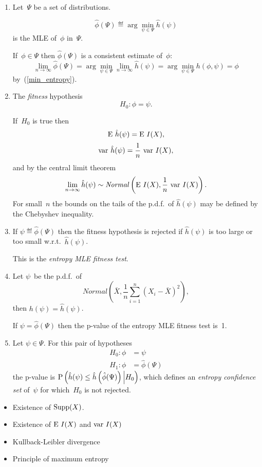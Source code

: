 \documentclass[10pt,a4paper]{article}
\theoremstyle{plain} \newtheorem{Lem}{Lemma}
\begin{document}
\begin{enumerate}
\item
Let~$\Psi$ be a set of distributions.

$$ \hat \phi(\Psi) \eqdef \arg \min_{\psi \in \Psi} \hat h(\psi) $$
is the MLE of~$\phi$ in~$\Psi$.

If~$\phi \in \Psi$ then $\hat \phi(\Psi)$ is a consistent estimate of~$\phi$:
$$ \lim_{n \to \infty} \hat \phi(\Psi) = \arg \min_{\psi \in \Psi} \lim_{n \to \infty} \hat h(\psi) = \arg \min_{\psi \in \Psi} h(\phi,\psi) = \phi $$
by~(\ref{min_entropy}).

\item
The {\em fitness} hypothesis
$$ H_0: \phi = \psi. $$

If~$H_0$ is true then
$$ \E \hat h(\psi) = \E I (X), $$
$$ \var \hat h(\psi) = \frac 1 n \ \var I(X), $$
and by the central limit theorem
$$\lim_{n \to \infty} \hat h(\psi) \sim \mathit{Normal} \left(\E I (X), \frac 1 n \ \var I(X) \right).$$
For small~$n$ the bounds on the tails of the p.d.f.~of $\hat h(\psi)$ may be defined by the Chebyshev inequality.

\item
If $\psi \eqdef \hat \phi(\Psi)$ then
the fitness hypothesis is rejected if $\hat h(\psi)$ is too large or too small w.r.t.~$\hat h(\psi)$.

This is the {\em entropy MLE fitness test}.

\item
Let $\psi$~be the p.d.f.~of $$\mathit{Normal} \left(\bar X, \frac 1 n \sum_{i=1}^n (X_i - \bar X)^2 \right), $$
then $h(\psi) = \hat h(\psi)$.

If $\psi = \hat \phi(\Psi)$ then the p-value of the entropy MLE fitness test is~1.

\item
Let $\psi \in \Psi$.
For this pair of hypotheses
\begin{equation*}
\begin{split}
H_0: \phi &= \psi \\
H_1: \phi &= \hat \phi(\Psi)
\end{split}
\end{equation*}
the p-value is $\P \left(\hat h(\psi) \le \hat h \left(\hat \phi(\Psi) \right) \Big| H_0 \right)$,
which defines an {\em entropy confidence set} of~$\psi$ for which~$H_0$ is not rejected.


\end{enumerate}




\Questions
\begin{itemize}
  \item Existence of $\supp(X)$.
  \item Existence of $\E I(X)$ and $\var I(X)$
  \item Kullback-Leibler divergence
  \item Principle of maximum entropy
\end{itemize}
\end{document}
